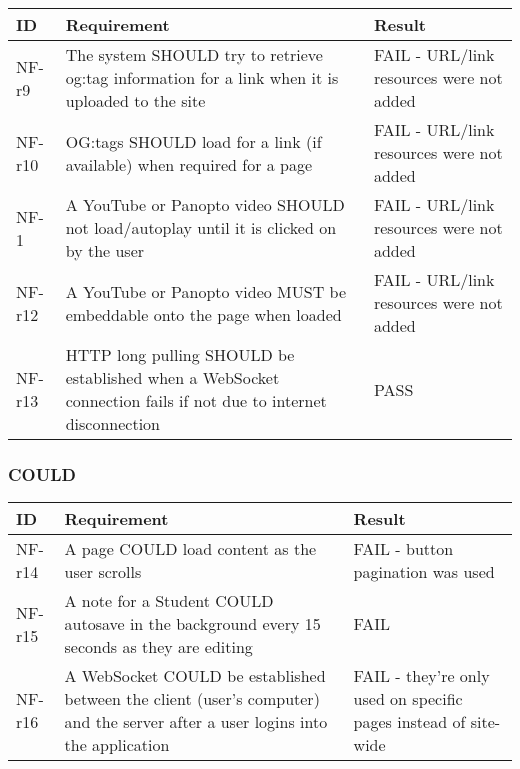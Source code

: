 \begin{tabular}{|p{1cm}|p{10cm}|p{3cm}|}
    \hline
        \textbf{ID} & \textbf{Requirement} & \textbf{Result} \\
    \hline
    NF-r9 &
    The system SHOULD try to retrieve og:tag information for a link when it is uploaded to the site & 
    FAIL - URL/link resources were not added \\
    \hline
    NF-r10 &
    OG:tags SHOULD load for a link (if available) when required for a page & 
    FAIL - URL/link resources were not added \\
    \hline
    NF-1 &
    A YouTube or Panopto video SHOULD not load/autoplay until it is clicked on by the user & 
    FAIL - URL/link resources were not added \\
    \hline
    NF-r12 &
    A YouTube or Panopto video MUST be embeddable onto the page when loaded & 
    FAIL - URL/link resources were not added \\
    \hline
    NF-r13 &
    HTTP long pulling SHOULD be established when a WebSocket connection fails if not due to internet disconnection & 
    PASS \\
    \hline
\end{tabular}

\subsubsection{COULD}

\begin{tabular}{|p{1cm}|p{10cm}|p{3cm}|}
    \hline
        \textbf{ID} & \textbf{Requirement} & \textbf{Result} \\
    \hline
    NF-r14 &
    A page COULD load content as the user scrolls & 
    FAIL - button pagination was used \\
    \hline
    NF-r15 &
    A note for a Student COULD autosave in the background every 15 seconds as they are editing & 
    FAIL \\
    \hline
    NF-r16 &
    A WebSocket COULD be established between the client (user’s computer) and the server after a user logins into the application & 
    FAIL - they're only used on specific pages instead of site-wide \\
    \hline
\end{tabular}